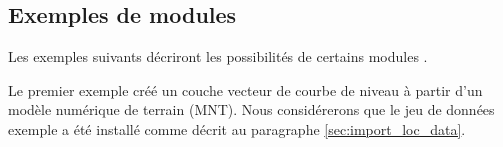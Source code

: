 \subsection{Exemples de modules \grass }
Les exemples suivants décriront les possibilités de certains modules \grass.


Le premier exemple créé un couche vecteur de courbe de niveau à partir d'un modèle numérique de terrain (MNT). Nous considérerons que le jeu de données exemple  a été installé comme décrit au paragraphe \ref{sec:import_loc_data}.

